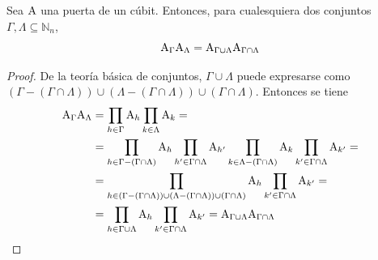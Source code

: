 \begin{proposition}
  Sea $\text{A}$ una puerta de un cúbit.
  Entonces, para cualesquiera dos conjuntos $\Gamma, \Lambda \subseteq \mathbb{N}_n$,
  \begin{equation}
    \label{eq:junta-puertas}
    \text{A}_\Gamma\text{A}_{\Lambda} = \text{A}_{\Gamma\cup\Lambda}\text{A}_{\Gamma\cap\Lambda}
  \end{equation}

\end{proposition}
\begin{proof}
  De la teoría básica de conjuntos, $\Gamma\cup\Lambda$ puede expresarse como $(\Gamma-(\Gamma\cap\Lambda))\cup(\Lambda-(\Gamma\cap\Lambda))\cup(\Gamma\cap\Lambda)$. Entonces se tiene
  \begin{align*}
    \text{A}_{\Gamma}\text{A}_{\Lambda} & =\prod_{h\in\Gamma}\text{A}_{h}\prod_{k\in\Lambda}\text{A}_{k}=                                                                                                                                                       \\
                                        & =\prod_{h\in\Gamma-(\Gamma\cap\Lambda)}\text{A}_{h}\prod_{h^\prime\in\Gamma\cap\Lambda}\text{A}_{h^\prime}\prod_{k\in\Lambda-(\Gamma\cap\Lambda)}\text{A}_{k}\prod_{k^\prime\in\Gamma\cap\Lambda}\text{A}_{k^\prime}= \\
                                        & =\prod_{h\in(\Gamma-(\Gamma\cap\Lambda))\cup(\Lambda-(\Gamma\cap\Lambda))\cup(\Gamma\cap\Lambda)}\text{A}_{h}\prod_{k^\prime\in\Gamma\cap\Lambda}\text{A}_{k^\prime}=                                                 \\
                                        & =\prod_{h\in\Gamma\cup\Lambda}\text{A}_{h}\prod_{k^\prime\in\Gamma\cap\Lambda}\text{A}_{k^\prime}=\text{A}_{\Gamma\cup\Lambda}\text{A}_{\Gamma\cap\Lambda}
  \end{align*}
\end{proof}

